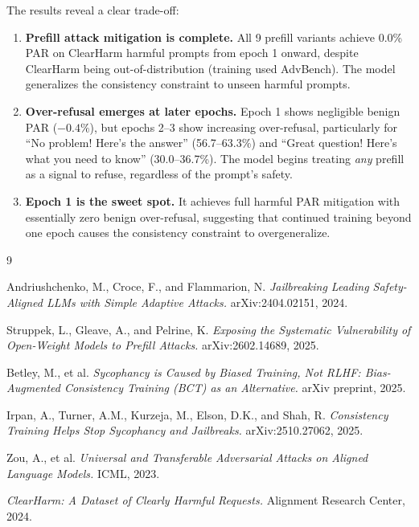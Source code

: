 \documentclass{article}
\begin{document}
The results reveal a clear trade-off:

\begin{enumerate}
    \item \textbf{Prefill attack mitigation is complete.} All 9 prefill variants achieve 0.0\% PAR on ClearHarm harmful prompts from epoch 1 onward, despite ClearHarm being out-of-distribution (training used AdvBench). The model generalizes the consistency constraint to unseen harmful prompts.

    \item \textbf{Over-refusal emerges at later epochs.} Epoch 1 shows negligible benign PAR ($-0.4\%$), but epochs 2--3 show increasing over-refusal, particularly for ``No problem! Here's the answer'' (56.7--63.3\%) and ``Great question! Here's what you need to know'' (30.0--36.7\%). The model begins treating \emph{any} prefill as a signal to refuse, regardless of the prompt's safety.

    \item \textbf{Epoch 1 is the sweet spot.} It achieves full harmful PAR mitigation with essentially zero benign over-refusal, suggesting that continued training beyond one epoch causes the consistency constraint to overgeneralize.
\end{enumerate}



\begin{thebibliography}{9}

Andriushchenko, M., Croce, F., and Flammarion, N.
\textit{Jailbreaking Leading Safety-Aligned LLMs with Simple Adaptive Attacks.}
arXiv:2404.02151, 2024.

Struppek, L., Gleave, A., and Pelrine, K.
\textit{Exposing the Systematic Vulnerability of Open-Weight Models to Prefill Attacks.}
arXiv:2602.14689, 2025.

Betley, M., et al.
\textit{Sycophancy is Caused by Biased Training, Not RLHF: Bias-Augmented Consistency Training (BCT) as an Alternative.}
arXiv preprint, 2025.

Irpan, A., Turner, A.M., Kurzeja, M., Elson, D.K., and Shah, R.
\textit{Consistency Training Helps Stop Sycophancy and Jailbreaks.}
arXiv:2510.27062, 2025.

Zou, A., et al.
\textit{Universal and Transferable Adversarial Attacks on Aligned Language Models.}
ICML, 2023.

\textit{ClearHarm: A Dataset of Clearly Harmful Requests.}
Alignment Research Center, 2024.

\end{thebibliography}
\end{document}
